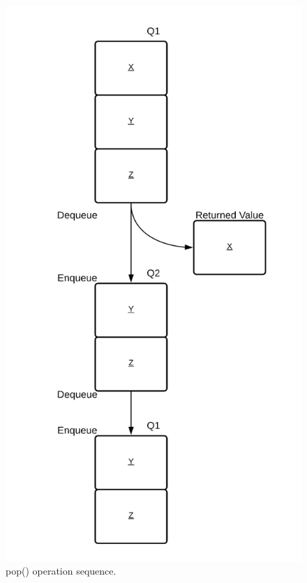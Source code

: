 \documentclass[journal]{IEEEtran}
\begin{document}
\begin{figure}[H]
    \includegraphics[scale = 0.17]{pop.png}
    \caption{pop() operation sequence.}
\end{figure}
\end{document}
